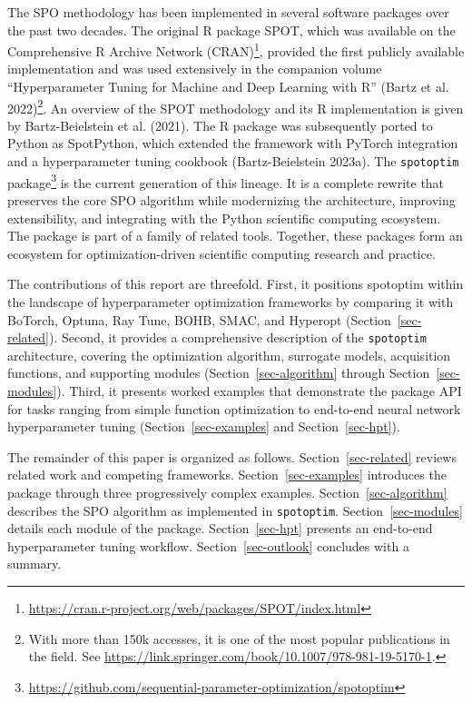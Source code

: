 \documentclass[
  twocolumn]{article}
\begin{document}
The SPO methodology has been implemented in several software packages
over the past two decades. The original R package SPOT, which was
available on the Comprehensive R Archive Network (CRAN)\footnote{\url{https://cran.r-project.org/web/packages/SPOT/index.html}},
provided the first publicly available implementation and was used
extensively in the companion volume ``Hyperparameter Tuning for Machine
and Deep Learning with R'' (Bartz et al. 2022)\footnote{With more than
  150k accesses, it is one of the most popular publications in the
  field. See
  \url{https://link.springer.com/book/10.1007/978-981-19-5170-1}.}. An
overview of the SPOT methodology and its R implementation is given by
Bartz-Beielstein et al. (2021). The R package was subsequently ported to
Python as SpotPython, which extended the framework with PyTorch
integration and a hyperparameter tuning cookbook (Bartz-Beielstein
2023a). The \texttt{spotoptim} package\footnote{\url{https://github.com/sequential-parameter-optimization/spotoptim}}
is the current generation of this lineage. It is a complete rewrite that
preserves the core SPO algorithm while modernizing the architecture,
improving extensibility, and integrating with the Python scientific
computing ecosystem. The package is part of a family of related tools.
Together, these packages form an ecosystem for optimization-driven
scientific computing research and practice.

The contributions of this report are threefold. First, it positions
spotoptim within the landscape of hyperparameter optimization frameworks
by comparing it with BoTorch, Optuna, Ray Tune, BOHB, SMAC, and Hyperopt
(Section~\ref{sec-related}). Second, it provides a comprehensive
description of the \texttt{spotoptim} architecture, covering the
optimization algorithm, surrogate models, acquisition functions, and
supporting modules (Section~\ref{sec-algorithm} through
Section~\ref{sec-modules}). Third, it presents worked examples that
demonstrate the package API for tasks ranging from simple function
optimization to end-to-end neural network hyperparameter tuning
(Section~\ref{sec-examples} and Section~\ref{sec-hpt}).

The remainder of this paper is organized as follows.
Section~\ref{sec-related} reviews related work and competing frameworks.
Section~\ref{sec-examples} introduces the package through three
progressively complex examples. Section~\ref{sec-algorithm} describes
the SPO algorithm as implemented in \texttt{spotoptim}.
Section~\ref{sec-modules} details each module of the package.
Section~\ref{sec-hpt} presents an end-to-end hyperparameter tuning
workflow. Section~\ref{sec-outlook} concludes with a summary.
\end{document}
